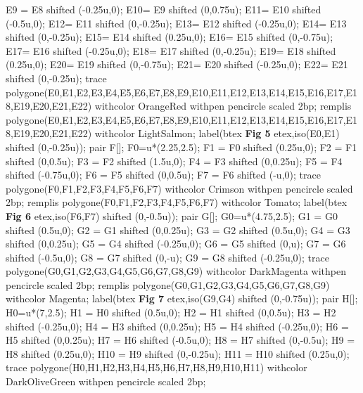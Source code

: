 \begin{exercice*}
\begin{Geometrie}[CoinHD={(8u,8u)}]
        E9 = E8  shifted (-0.25u,0);
        E10= E9  shifted (0,0.75u);%
        E11= E10 shifted (-0.5u,0);
        E12= E11  shifted (0,-0.25u);
        E13= E12  shifted (-0.25u,0);
        E14= E13  shifted (0,-0.25u);
        E15= E14  shifted (0.25u,0);
        E16= E15  shifted (0,-0.75u);
        E17= E16  shifted (-0.25u,0);
        E18= E17  shifted (0,-0.25u);
        E19= E18  shifted (0.25u,0);
        E20= E19 shifted (0,-0.75u);
        E21= E20  shifted (-0.25u,0);
        E22= E21 shifted (0,-0.25u);
        trace   polygone(E0,E1,E2,E3,E4,E5,E6,E7,E8,E9,E10,E11,E12,E13,E14,E15,E16,E17,E18,E19,E20,E21,E22) withcolor OrangeRed withpen pencircle scaled 2bp;
        remplis polygone(E0,E1,E2,E3,E4,E5,E6,E7,E8,E9,E10,E11,E12,E13,E14,E15,E16,E17,E18,E19,E20,E21,E22) withcolor LightSalmon;            
        label(btex {\bfseries Fig 5} etex,iso(E0,E1) shifted (0,-0.25u));
        pair F[];
        F0=u*(2.25,2.5);
        F1 = F0  shifted (0.25u,0);
        F2 = F1  shifted (0,0.5u);
        F3 = F2  shifted (1.5u,0);
        F4 = F3  shifted (0,0.25u);
        F5 = F4  shifted (-0.75u,0);
        F6 = F5  shifted (0,0.5u);
        F7 = F6  shifted (-u,0);
        trace   polygone(F0,F1,F2,F3,F4,F5,F6,F7) withcolor Crimson withpen pencircle scaled 2bp;
        remplis polygone(F0,F1,F2,F3,F4,F5,F6,F7) withcolor Tomato;            
        label(btex {\bfseries Fig 6} etex,iso(F6,F7) shifted (0,-0.5u));
        pair G[];
        G0=u*(4.75,2.5);
        G1 = G0  shifted (0.5u,0);
        G2 = G1  shifted (0,0.25u);
        G3 = G2  shifted (0.5u,0);
        G4 = G3  shifted (0,0.25u);
        G5 = G4  shifted (-0.25u,0);
        G6 = G5  shifted (0,u);
        G7 = G6  shifted (-0.5u,0);
        G8 = G7  shifted (0,-u);
        G9 = G8  shifted (-0.25u,0);
        trace   polygone(G0,G1,G2,G3,G4,G5,G6,G7,G8,G9) withcolor DarkMagenta withpen pencircle scaled 2bp;
        remplis polygone(G0,G1,G2,G3,G4,G5,G6,G7,G8,G9) withcolor Magenta;
        label(btex {\bfseries Fig 7} etex,iso(G9,G4) shifted (0,-0.75u));
        pair H[];
        H0=u*(7,2.5);
        H1  = H0  shifted (0.5u,0);
        H2  = H1  shifted (0,0.5u);
        H3  = H2  shifted (-0.25u,0);
        H4  = H3  shifted (0,0.25u);
        H5  = H4  shifted (-0.25u,0);
        H6  = H5  shifted (0,0.25u);
        H7  = H6  shifted (-0.5u,0);
        H8  = H7  shifted (0,-0.5u);
        H9  = H8  shifted (0.25u,0);
        H10 = H9  shifted (0,-0.25u);
        H11 = H10  shifted (0.25u,0);
        trace   polygone(H0,H1,H2,H3,H4,H5,H6,H7,H8,H9,H10,H11) withcolor DarkOliveGreen withpen pencircle scaled 2bp;

\end{Geometrie}
\end{exercice*}
